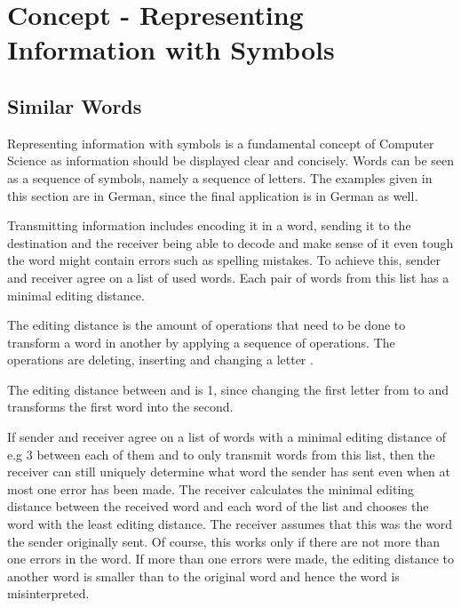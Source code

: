 \chapter{Concept - Representing Information with Symbols}
\label{chapter:representingInformationWithWymbols}

\section{Similar Words}
\label{section:similarWords}

Representing information with symbols is a fundamental concept of Computer Science as information should be displayed clear and concisely. Words can be seen as a sequence of symbols, namely a sequence of letters. The examples given in this section are in German, since the final application is in German as well.

Transmitting information includes encoding it in a word, sending it to the destination and the receiver being able to decode and make sense of it even tough the word might contain errors such as spelling mistakes. To achieve this, sender and receiver agree on a list of used words. Each pair of words from this list has a minimal editing distance. 

The editing distance is the amount of operations that need to be done to transform a word in another by applying a sequence of operations. The operations are deleting, inserting and changing a letter \cite{AnD}.

\begin{example}
    The editing distance between  and  is 1, since changing the first letter from  to and  transforms the first word into the second.
\end{example}

If sender and receiver agree on a list of words with a minimal editing distance of e.g 3 between each of them and to only transmit words from this list, then the receiver can still uniquely determine what word the sender has sent even when at most one error has been made. The receiver calculates the minimal editing distance between the received word and each word of the list and chooses the word with the least editing distance. The receiver assumes that this was the word the sender originally sent. Of course, this works only if there are not more than one errors in the word. If more than one errors were made, the editing distance to another word is smaller than to the original word and hence the word is misinterpreted.

